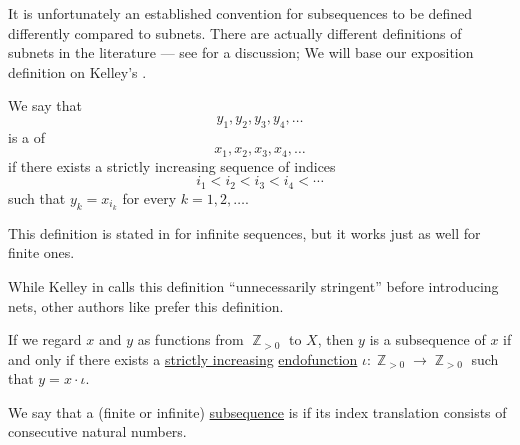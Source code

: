 It is unfortunately an established convention for subsequences to be defined differently compared to subnets. There are actually different definitions of subnets in the literature --- see \cite[\S 7.14]{Schechter1997AnalysisHandbook} for a discussion; We will base our exposition definition on Kelley's \cite[ch. 2]{Kelley1975GeneralTopology}.

\begin{definition}\label{def:subsequence}
  We say that
  \begin{equation}\label{eq:def:subsequence/sub}
    y_1, y_2, y_3, y_4, \ldots
  \end{equation}
  is a  of
  \begin{equation}\label{eq:def:subsequence/original}
    x_1, x_2, x_3, x_4, \ldots
  \end{equation}
  if there exists a strictly increasing sequence of indices
  \begin{equation*}
    i_1 < i_2 < i_3 < i_4 < \cdots
  \end{equation*}
  such that \( y_k = x_{i_k} \) for every \( k = 1, 2, \ldots \).
\end{definition}
\begin{comments}
  \item This definition is stated in \cite[63]{Kelley1975GeneralTopology} for infinite sequences, but it works just as well for finite ones.

  \item While Kelley in \cite[63]{Kelley1975GeneralTopology} calls this definition \enquote{unnecessarily stringent} before introducing nets, other authors like \textcite[def. 3.5]{Rudin1976AnalysisPrinciples} prefer this definition.

  \item If we regard \( x \) and \( y \) as functions from \( \BbbZ_{>0} \) to \( X \), then \( y \) is a subsequence of \( x \) if and only if there exists a \hyperref[def:order_function/preserving]{strictly increasing} \hyperref[def:endofunction]{endofunction} \( \iota: \BbbZ_{>0} \to \BbbZ_{>0} \) such that \( y = x \cdot \iota \).
\end{comments}

\begin{definition}\label{def:contiguous_subsequence}\mimprovised
  We say that a (finite or infinite) \hyperref[def:subsequence]{subsequence} is  if its index translation consists of consecutive natural numbers.
\end{definition}

